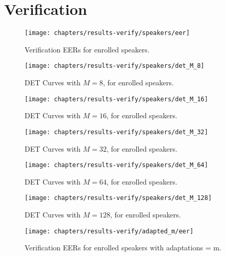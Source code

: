 \chapter{Verification}
\label{apx:results-verify}



\begin{figure}[ht]
	\centering
	\texttt{[image: chapters/results-verify/speakers/eer]}
	\caption{Verification EERs for enrolled speakers.}
	\label{fig:results-verify}
\end{figure}

\newpage
\begin{figure}[ht]
	\centering
	\texttt{[image: chapters/results-verify/speakers/det\_M\_8]}
	\caption{DET Curves with $M = 8$, for enrolled speakers.}
	\label{fig:results-verify-M_8}
\end{figure}

\begin{figure}[ht]
	\centering
	\texttt{[image: chapters/results-verify/speakers/det\_M\_16]}
	\caption{DET Curves with $M = 16$, for enrolled speakers.}
	\label{fig:results-verify-M_16}
\end{figure}

\newpage
\begin{figure}[ht]
	\centering
	\texttt{[image: chapters/results-verify/speakers/det\_M\_32]}
	\caption{DET Curves with $M = 32$, for enrolled speakers.}
	\label{fig:results-verify-M_32}
\end{figure}

\begin{figure}[ht]
	\centering
	\texttt{[image: chapters/results-verify/speakers/det\_M\_64]}
	\caption{DET Curves with $M = 64$, for enrolled speakers.}
	\label{fig:results-verify-M_64}
\end{figure}

\newpage
\begin{figure}[ht]
	\centering
	\texttt{[image: chapters/results-verify/speakers/det\_M\_128]}
	\caption{DET Curves with $M = 128$, for enrolled speakers.}
	\label{fig:results-verify-M_128}
\end{figure}

\clearpage

\newpage


\begin{figure}[ht]
	\centering
	\texttt{[image: chapters/results-verify/adapted\_m/eer]}
	\caption{Verification EERs for enrolled speakers with adaptations = m.}
	\label{fig:results-verify-adapted_m}
\end{figure}


